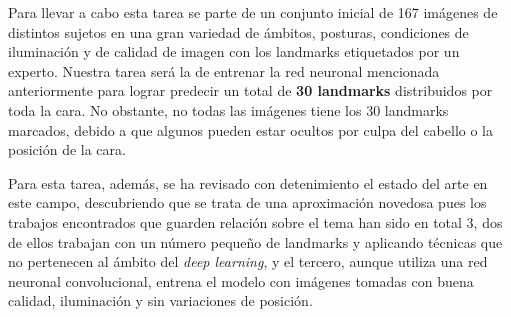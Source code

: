 \medskip

\noindent Para llevar a cabo esta tarea se parte de un conjunto inicial de 167 imágenes de distintos sujetos en una gran variedad de ámbitos, posturas, condiciones de iluminación y de calidad de imagen con los landmarks etiquetados por un experto. Nuestra tarea será la de entrenar la red neuronal mencionada anteriormente para lograr predecir un total de \textbf{30 landmarks} distribuidos por toda la cara. No obstante, no todas las imágenes tiene los 30 landmarks marcados, debido a que algunos pueden estar ocultos por culpa del cabello o la posición de la cara.

\medskip

\noindent Para esta tarea, además, se ha revisado con detenimiento el estado del arte en este campo, descubriendo que se trata de una aproximación novedosa pues los trabajos encontrados que guarden relación sobre el tema han sido en total 3, dos de ellos trabajan con un número pequeño de landmarks y aplicando técnicas que no pertenecen al ámbito del \textit{deep learning}, y el tercero, aunque utiliza una red neuronal convolucional, entrena el modelo con imágenes tomadas con buena calidad, iluminación y sin variaciones de posición.


\endinput
